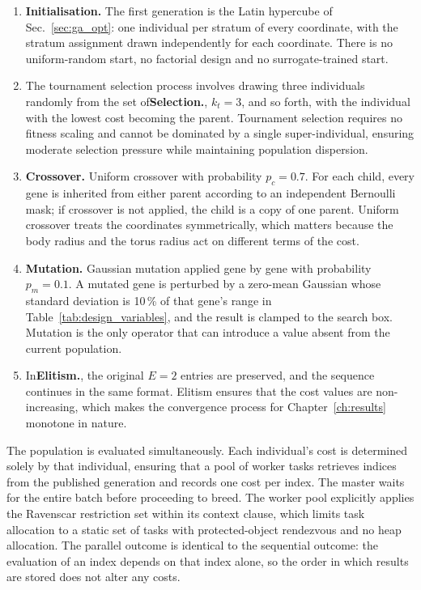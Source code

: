 \begin{enumerate}
    \item \textbf{Initialisation.} The first generation is the Latin hypercube of Sec.~\ref{sec:ga_opt}: one individual per stratum of every coordinate, with the stratum assignment drawn independently for each coordinate. There is no uniform-random start, no factorial design and no surrogate-trained start.

    \item The tournament selection process involves drawing three individuals randomly from the set of\textbf{Selection.}, $k_t = 3$, and so forth, with the individual with the lowest cost becoming the parent. Tournament selection requires no fitness scaling and cannot be dominated by a single super-individual, ensuring moderate selection pressure while maintaining population dispersion.

    \item \textbf{Crossover.} Uniform crossover with probability $p_c = 0.7$. For each child, every gene is inherited from either parent according to an independent Bernoulli mask; if crossover is not applied, the child is a copy of one parent. Uniform crossover treats the coordinates symmetrically, which matters because the body radius and the torus radius act on different terms of the cost.

    \item \textbf{Mutation.} Gaussian mutation applied gene by gene with probability $p_m = 0.1$. A mutated gene is perturbed by a zero-mean Gaussian whose standard deviation is 10\,\% of that gene's range in Table~\ref{tab:design_variables}, and the result is clamped to the search box. Mutation is the only operator that can introduce a value absent from the current population.

    \item In\textbf{Elitism.}, the original $E = 2$ entries are preserved, and the sequence continues in the same format. Elitism ensures that the cost values are non-increasing, which makes the convergence process for Chapter~\ref{ch:results} monotone in nature.
\end{enumerate}

The population is evaluated simultaneously. Each individual's cost is determined solely by that individual, ensuring that a pool of worker tasks retrieves indices from the published generation and records one cost per index. The master waits for the entire batch before proceeding to breed. The worker pool explicitly applies the Ravenscar restriction set within its context clause, which limits task allocation to a static set of tasks with protected-object rendezvous and no heap allocation. The parallel outcome is identical to the sequential outcome: the evaluation of an index depends on that index alone, so the order in which results are stored does not alter any costs.

